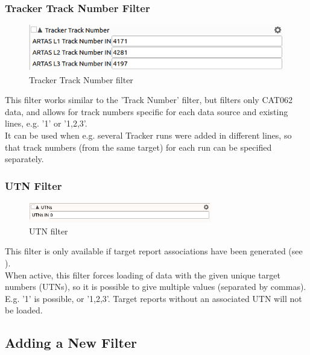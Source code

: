 \subsubsection{Tracker Track Number Filter}

\begin{figure}[H]
  \center
    \includegraphics[width=12cm,frame]{figures/filter_trackertracknum.png}
  \caption{Tracker Track Number filter}
\end{figure}

This filter works similar to the 'Track Number' filter, but filters only CAT062 data, and allows for track numbers specific for each data source and existing lines, e.g. '1' or '1,2,3'.\\

It can be used when e.g. several Tracker runs were added in different lines, so that track numbers (from the same target) for each run can be specified separately. \\

\subsubsection{UTN Filter}

\begin{figure}[H]
  \center
    \includegraphics[width=8cm,frame]{figures/filter_utn.png}
  \caption{UTN filter}
\end{figure}

This filter is only available if target report associations have been generated (see ). \\

When active, this filter forces loading of data with the given unique target numbers (UTNs), so it is possible to give multiple values (separated by commas). E.g. '1' is possible, or '1,2,3'. Target reports without an associated UTN will not be loaded. \\

\subsection{Adding a New Filter}
\label{sec:filter_add}

